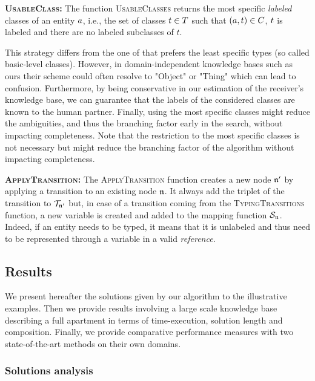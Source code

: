 \documentclass[a4paper,11pt,twoside]{StyleThese}
\begin{document}
\textbf{\textsc{UsableClass}:}
The function \textsc{UsableClasses} returns the most specific \textit{labeled} classes of an entity $a$, i.e., the set of classes $t \in T$ such that $(a, t) \in C$, $t$ is labeled and there are no labeled subclasses of $t$.

This strategy differs from the one of \cite{dale1995computational} that prefers the least specific types (so called basic-level classes).
However, in domain-independent knowledge bases such as ours their scheme could often resolve to "Object" or "Thing" which can lead to confusion.
Furthermore, by being conservative in our estimation of the receiver's knowledge base, we can guarantee that the labels of the considered classes are known to the human partner.
Finally, using the most specific classes might reduce the ambiguities, and thus the branching factor early in the search, without impacting completeness.
Note that the restriction to the most specific classes is not necessary but might reduce the branching factor of the algorithm without impacting completeness.

\textbf{\textsc{ApplyTransition}:}
The \textsc{ApplyTransition} function creates a new node $\mathfrak{n}'$ by applying a transition to an existing node $\mathfrak{n}$. It always add the triplet of the transition to $\mathcal{T}_{\mathfrak{n}'}$ but, in case of a transition coming from the \textsc{TypingTransitions} function, a new variable is created and added to the mapping function $\mathcal{S}_{\mathfrak{n}}$. Indeed, if an entity needs to be typed, it means that it is unlabeled and thus need to be represented through a variable in a valid \textit{reference}.


\subsection{Results}
We present hereafter the solutions given by our algorithm to the illustrative examples. Then we provide results involving a large scale knowledge base describing a full apartment in terms of time-execution, solution length and composition. Finally, we provide comparative performance measures with two state-of-the-art methods on their own domains.

\subsubsection{Solutions analysis}
\end{document}

